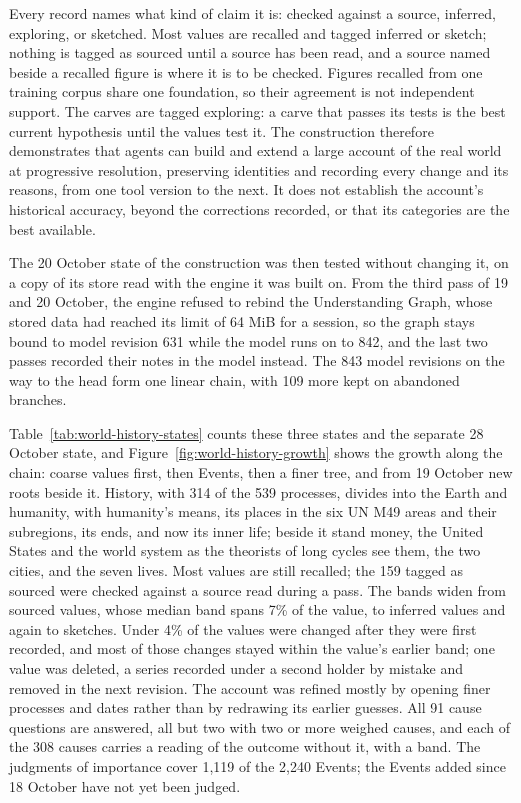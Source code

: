 \documentclass[11pt,a4paper]{article}
\begin{document}


Every record names what kind of claim it is: checked against a source, inferred,
exploring, or sketched. Most values are recalled and tagged inferred or sketch;
nothing is tagged as sourced until a source has been read, and a source named
beside a recalled figure is where it is to be checked. Figures recalled from one
training corpus share one foundation, so their agreement is not independent
support. The carves are tagged exploring: a carve that passes its tests is the
best current hypothesis until the values test it. The construction therefore
demonstrates that agents can build and extend a large account of the real world
at progressive resolution, preserving identities and recording every change and
its reasons, from one tool version to the next. It does not establish the
account's historical accuracy, beyond the corrections recorded, or that its
categories are the best available.

The 20 October state of the construction was then tested without changing it, on a
copy of its store read with the engine it was built on. From the third pass of
19 and 20 October, the engine refused to rebind the Understanding Graph, whose
stored data had reached its limit of 64 MiB for a session, so the graph stays
bound to model revision 631 while the model runs on to 842, and the last two
passes recorded their notes in the model instead. The 843 model revisions on the
way to the head form one linear chain, with 109 more kept on abandoned branches.

Table~\ref{tab:world-history-states} counts these three states and the separate
28 October state, and
Figure~\ref{fig:world-history-growth} shows the growth along the
chain: coarse values first, then Events, then a finer tree, and from 19 October
new roots beside it. History, with 314 of the 539 processes, divides into the
Earth and humanity, with humanity's means, its places in the six UN M49 areas
and their subregions, its ends, and now its inner life; beside it stand money,
the United States and the world system as the theorists of long cycles see them,
the two cities, and the seven lives. Most values are still recalled; the 159
tagged as sourced were checked against a source read during a pass. The bands
widen from sourced values, whose median band spans 7\% of the value, to inferred
values and again to sketches. Under 4\% of the values were changed after they
were first recorded, and most of those changes stayed within the value's earlier
band; one value was deleted, a series recorded under a second holder by mistake
and removed in the next revision. The account was refined mostly by opening
finer processes and dates rather than by redrawing its earlier guesses. All 91
cause questions are answered, all but two with two or more weighed causes, and
each of the 308 causes carries a reading of the outcome without it, with a band.
The judgments of importance cover 1,119 of the 2,240 Events; the Events added
since 18 October have not yet been judged.
\end{document}
